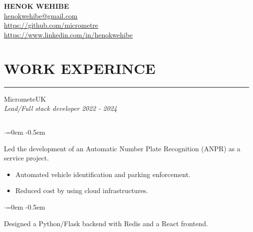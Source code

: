\documentclass{article}
\begin{document}
\begin{center}
\textbf{\huge HENOK WEHIBE} \\
\vspace{1.5em}
\href{mailto:henokwehibe@gmail.com}{henokwehibe@gmail.com} \\
\vspace{0.5em}
\href{https://github.com/micrometre}{https://github.com/micrometre }\\
\vspace{0.5em}
\href{https://www.linkedin.com/in/henokwehibe}{https://www.linkedin.com/in/henokwehibe}
\end{center}


\section* {WORK EXPERINCE}
\vspace{-0.6em}
\hrule 
\vspace{0.4em}
{\bf}MicrometeUK \hfill {} \\%
{\em Lead/Full stack developer} \hfill {\em 2022 - 2024 } %
\subsection*{}
\vspace{-2.6em}
\begin{list}{$\cdot$}{\leftmargin=0em} %
    \itemsep -0.5em \vspace{-0.5em} %
    \item Led the development of an Automatic Number Plate Recognition (ANPR) as a service project.
\end{list}
\vspace{-1.6em}
\begin{itemize}
    \item Automated vehicle identification and parking enforcement. 
    \item Reduced cost by using cloud infrastructures. 
\end{itemize}
\begin{list}{$\cdot$}{\leftmargin=0em} %
    \itemsep -0.5em \vspace{-0.5em} %
    \item Designed a Python/Flask backend with Redis and a React frontend. 
\end{list}
\end{document}
